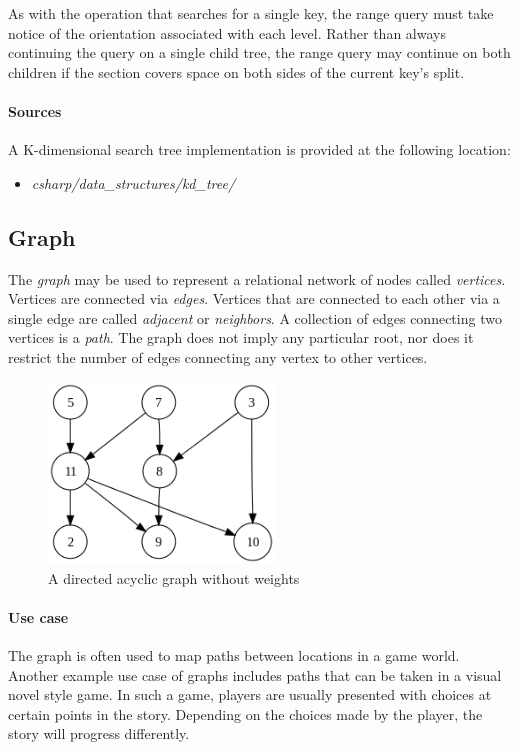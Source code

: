 \documentclass{article}
\begin{document}
As with the operation that searches for a single key, the range query must take notice of the orientation
associated with each level. Rather than always continuing the query on a single child tree,
the range query may continue on both children if the section covers space on both sides of the current key's split.

\begin{samepage}
  \paragraph{Sources}
  A K-dimensional search tree implementation is provided at the following location:
  \begin{itemize}
  \item{{\em csharp/data\_structures/kd\_tree/}}
  \end{itemize}
\end{samepage}




\subsection{Graph}
The {\em graph} may be used to represent a relational network of nodes called {\em vertices}.
Vertices are connected via {\em edges}. Vertices that are connected to each other via a single edge are called
{\em adjacent} or {\em neighbors}. A collection of edges connecting two vertices is a {\em path}. The graph does
not imply any particular root, nor does it restrict the number of edges connecting any vertex to other vertices.

\begin{figure}[H]
  \centering
  \includegraphics[width=6cm]{graph_0}
  \caption{A directed acyclic graph without weights}
\end{figure}

\paragraph{Use case}
The graph is often used to map paths between locations in a game world. Another example use case of graphs includes paths that
can be taken in a visual novel style game. In such a game, players are usually presented with choices at certain points in
the story. Depending on the choices made by the player, the story will progress differently.
\end{document}
